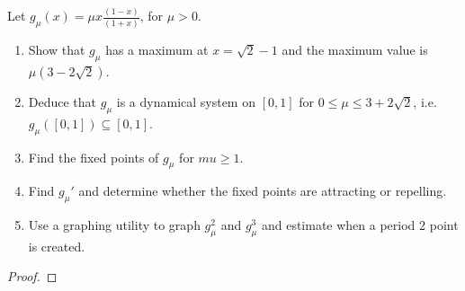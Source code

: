 \begin{problem}{2}
  Let $\displaystyle g_\mu(x) = \mu x \frac{(1-x)}{(1+x)}$, for $\mu > 0$.

  \begin{enumerate}
    \item Show that $g_\mu$ has a maximum at $x = \sqrt{2} - 1$ and the maximum value is
      $\mu(3 - 2\sqrt{2})$.
    \item Deduce that $g_\mu$ is a dynamical system on $[0, 1]$
      for $0 \leq \mu \leq 3 + 2\sqrt{2}$, i.e. $g_\mu([0,1])\subseteq[0,1]$.
    \item Find the fixed points of $g_\mu$ for $mu \geq 1$.
    \item Find $g_\mu'$ and determine whether the fixed points are attracting
      or repelling.
    \item Use a graphing utility to graph $g_\mu^2$ and $g_\mu^3$
      and estimate when a period 2 point is created.
  \end{enumerate}
\end{problem}

\begin{proof}
\end{proof}
\newpage
